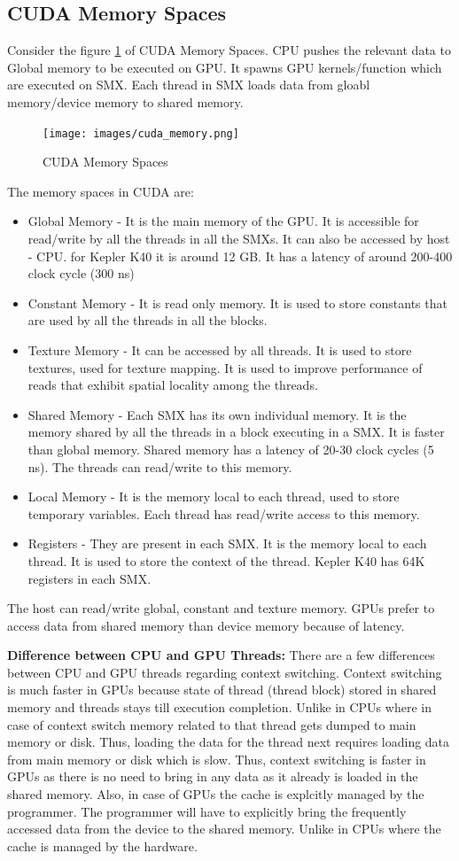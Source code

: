\documentclass[12pt]{article}
\begin{document}
\subsection{CUDA Memory Spaces}
Consider the figure \ref{fig:cuda_memory} of CUDA Memory Spaces. CPU pushes the relevant data to Global memory to be executed on GPU.
It spawns GPU kernels/function which are executed on SMX. Each thread in SMX loads data from gloabl memory/device memory to shared memory.
\begin{figure}[H]
    \centering
    \texttt{[image: images/cuda\_memory.png]}
    \caption{CUDA Memory Spaces}
    \label{fig:cuda_memory}
\end{figure}
The memory spaces in CUDA are:
\begin{itemize}
    \item Global Memory - It is the main memory of the GPU. It is accessible for read/write by all the threads in all the SMXs. 
    It can also be accessed by host - CPU. for Kepler K40 it is around 12 GB. It has a latency of around 200-400 clock cycle (300 ns)
    \item Constant Memory - It is read only memory. It is used to store constants that are used by all the threads in all the blocks.
    \item Texture Memory - It can be accessed by all threads. It is used to store textures, used for texture mapping. It is used to improve performance of reads that exhibit spatial locality among the threads.
    \item Shared Memory - Each SMX has its own individual memory. It is the memory shared by all the threads in a block executing in a SMX. It is faster than global memory. Shared memory has a latency of 20-30 clock cycles (5 ns). The threads can read/write to this memory.
    \item Local Memory - It is the memory local to each thread, used to store temporary variables. Each thread has read/write access to this memory.
    \item Registers - They are present in each SMX. It is the memory local to each thread. It is used to store the context of the thread. Kepler K40 has 64K registers in each SMX.
\end{itemize}
The host can read/write global, constant and texture memory. GPUs prefer to access data from shared memory than device memory because of latency.

\textbf{Difference between CPU and GPU Threads: }There are a few differences between CPU and GPU threads regarding context switching.
Context switching is much faster in GPUs because state of thread (thread block) stored in shared memory and threads stays till execution completion. Unlike in CPUs
where in case of context switch memory related to that thread gets dumped to main memory or disk. Thus, loading the data for the thread next requires loading data from main memory or disk which is 
slow. Thus, context switching is faster in GPUs as there is no need to bring in any data as it already is loaded in the shared memory. Also, in case
of GPUs the cache is explcitly managed by the programmer. The programmer will have to explicitly bring the frequently accessed data from the device to the shared memory. Unlike
in CPUs where the cache is managed by the hardware.
\end{document}
